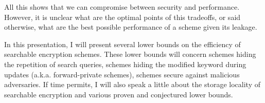 All this shows that we can compromise between security and performance. 
However, it is unclear what are the optimal points of this tradeoffs, or said otherwise, what are the best possible performance of a scheme given its leakage.

\medskip

In this presentation, I will present several lower bounds on the efficiency of searchable encryption schemes.
These lower bounds will concern schemes hiding the repetition of search queries, schemes hiding the modified keyword during updates (a.k.a. forward-private schemes), schemes secure against malicious adversaries.
If time permits, I will also speak a little about the storage locality of searchable encryption and various proven and conjectured lower bounds.

